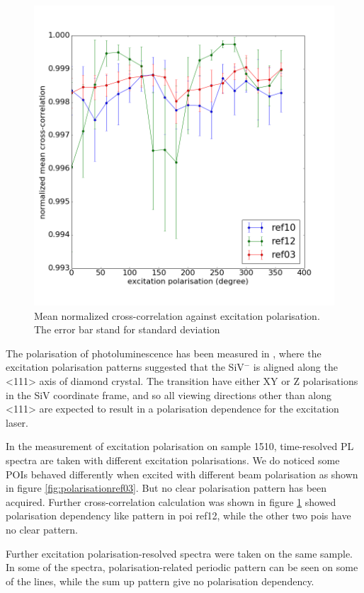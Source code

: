 \begin{figure}[h]
\centering
\includegraphics[width=0.7\linewidth]{"Figures/pic/excitation polarisation"}
\caption{Mean normalized cross-correlation against excitation polarisation. The error bar stand for standard deviation}
\label{fig:excitation-polarisation of untreated nanodiamond batch 2}
\end{figure}

The polarisation of photoluminescence has been measured in \cite{rogers_all-optical_2014}, where the excitation polarisation patterns suggested that the SiV$^{-}$ is aligned along the <111> axis of diamond crystal. The transition have either XY or Z polarisations in the SiV coordinate frame, and so all viewing directions other than along <111> are expected to result in a polarisation dependence for the excitation laser.

In the measurement of excitation polarisation on sample 1510, time-resolved PL spectra are taken with different excitation polarisations. We do noticed some POIs behaved differently when excited with different beam polarisation as shown in figure \ref{fig:polarisationref03}. But no clear polarisation pattern has been acquired. Further cross-correlation calculation was shown in figure \ref{fig:excitation-polarisation of untreated nanodiamond batch 2} showed polarisation dependency like pattern in poi ref12, while the other two pois have no clear pattern.

Further excitation polarisation-resolved spectra were taken on the same sample. In some of the spectra, polarisation-related periodic pattern can be seen on some of the lines, while the sum up pattern give no polarisation dependency.


